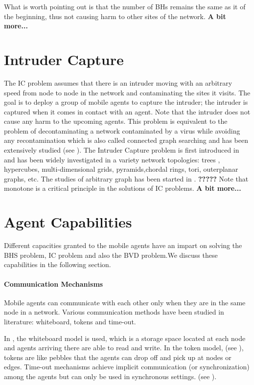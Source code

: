 What is worth pointing out is that the number of BHs remains the same as it of the beginning, thus not causing harm to other sites of the network.
 {\bf A bit more...}

\section{Intruder Capture}
The IC problem assumes that there is an intruder moving with an arbitrary speed from node to node in the network and contaminating the sites it visits. The goal is to deploy a group of mobile agents to capture the intruder; the intruder is captured when it comes in contact with an agent. Note that the intruder does not cause any harm to the upcoming agents. This problem is equivalent to the problem of decontaminating a network contaminated by a virus while avoiding any recontamination which is also called connected graph searching and has been extensively studied (see \cite{fomin}).  The Intruder Capture problem is first introduced in \cite{Flocchini} and has been widely investigated in a variety network topologies: trees \cite{Flocchini, Flocchini1,treeintruder}, hypercubes\cite{Flocchini2}, multi-dimensional grids\cite{Flocchini2}, pyramids\cite{Shar},chordal rings\cite{Flocchini3}, tori\cite{Floc3}, outerplanar graphs\cite{Iman}, etc. The studies of arbitrary graph has been started in \cite{Nisse,Nisse1}. {\bf ?????} Note that monotone is a critical principle in the solutions of IC problems.  
 {\bf A bit more...}

\section{Agent Capabilities}
Different capacities granted to the mobile agents have an impart on solving the BHS problem, IC problem and also the BVD problem.We discuss these capabilities in the following section.

\paragraph{Communication Mechanisms} 
Mobile agents can communicate with each other only when they are in the same node in a network. 
Various  communication methods have been studied in literature: whiteboard, tokens and time-out.  

 In \cite{J.C, Dobr, Flocchini4, A.K}, the whiteboard model is used, which is a storage space located at each node and agents arriving there are able to read and write. In the token model, (see \cite{ J.C1, Flocchini4}), tokens are like pebbles that    the agents can drop   off and pick up  at nodes or edges. Time-out mechanisms achieve implicit communication (or synchronization) among the agents but  can only be used in synchronous settings. (see \cite{C.C, C.C1, J.C2}).

